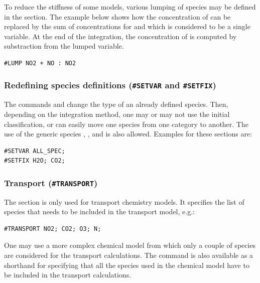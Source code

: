 \documentclass[twoside]{article}
\begin{document}
To reduce the stiffness of some models, various lumping of species may
be defined in the  section. The example below shows how the
concentration of  can be replaced by the sum of
concentrations for  and  which is considered to be a
single variable. At the end of the integration, the concentration of
 is computed by substraction from the lumped variable.
%
\begin{verbatim}
#LUMP NO2 + NO : NO2
\end{verbatim}

\subsubsection{Redefining species definitions ({\tt\#SETVAR} and
  {\tt\#SETFIX})}
\label{sec:section-setvar-setfix}

The commands  and  change the type of an
already defined species. Then, depending on the integration method, one
may or may not use the initial classification, or can easily move one
species from one category to another. The use of the generic species
, , and  is also allowed.
Examples for these sections are:
%
\begin{verbatim}
#SETVAR ALL_SPEC;
#SETFIX H2O; CO2;
\end{verbatim}

\subsubsection{Transport ({\tt\#TRANSPORT})}
\label{sec:section-transport}

The  section is only used for transport chemistry
models. It specifies the list of species that needs to be included in
the transport model, e.g.:
%
\begin{verbatim}
#TRANSPORT NO2; CO2; O3; N;
\end{verbatim}
%
One may use a more complex chemical model from which only a couple of
species are considered for the transport calculations. The
 command is also available as a shorthand for
specifying that all the species used in the chemical model have to be
included in the transport calculations.
\end{document}
